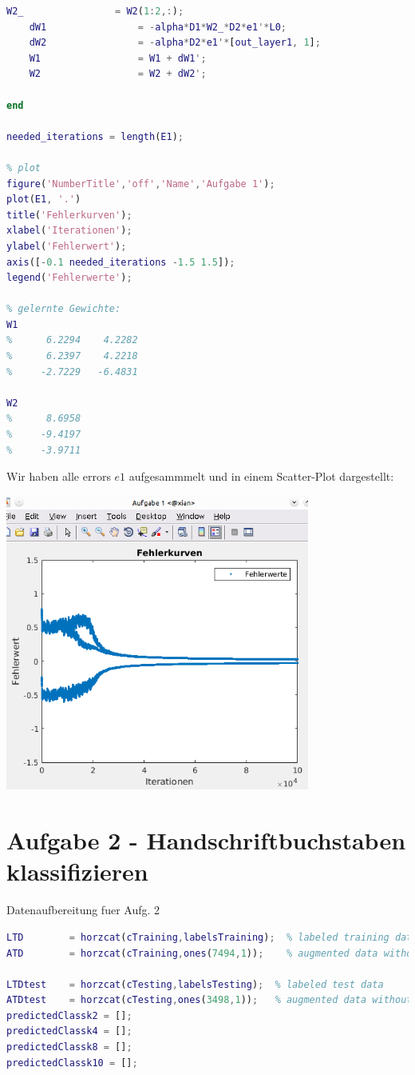 \documentclass[12pt]{article}
\begin{document}
\begin{lstlisting}[language=Matlab]
    W2_                = W2(1:2,:);
    dW1                = -alpha*D1*W2_*D2*e1'*L0;
    dW2                = -alpha*D2*e1'*[out_layer1, 1];
    W1                 = W1 + dW1';
    W2                 = W2 + dW2';

end

needed_iterations = length(E1);

% plot
figure('NumberTitle','off','Name','Aufgabe 1');
plot(E1, '.')
title('Fehlerkurven');
xlabel('Iterationen');
ylabel('Fehlerwert');
axis([-0.1 needed_iterations -1.5 1.5]);
legend('Fehlerwerte');

% gelernte Gewichte:
W1
%      6.2294    4.2282
%      6.2397    4.2218
%     -2.7229   -6.4831

W2
%      8.6958
%     -9.4197
%     -3.9711
\end{lstlisting}
Wir haben alle errors $e1$ aufgesammmelt und in einem Scatter-Plot dargestellt:\\
\begin{center}
\includegraphics[width=10cm]{Bilder/errorplot_aufg1.png}
\end{center}
\newpage

\section{Aufgabe 2 - Handschriftbuchstaben klassifizieren}

Datenaufbereitung fuer Aufg. 2\\
\begin{lstlisting}[language=Matlab]
LTD        = horzcat(cTraining,labelsTraining);  % labeled training data
ATD        = horzcat(cTraining,ones(7494,1));    % augmented data without labels

LTDtest    = horzcat(cTesting,labelsTesting);  % labeled test data
ATDtest    = horzcat(cTesting,ones(3498,1));   % augmented data without labels
predictedClassk2 = [];
predictedClassk4 = [];
predictedClassk8 = [];
predictedClassk10 = [];
\end{lstlisting}
\end{document}
